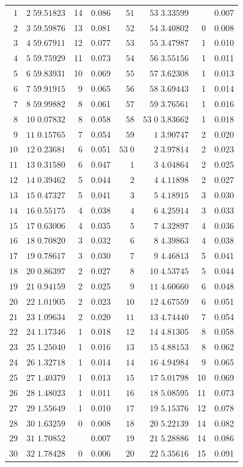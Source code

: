 \begin{center}
\begin{tabular}{|r|r|r|r||r|r|r|r|}
\(1\)&\(2\;59.51823\)&14&0.086&\(51\)&\(53\;3.33599\)&&0.007\\
\(2\)&\(3\;59.59876\)&13&0.081&\(52\)&\(54\;3.40802\)&0&0.008\\
\(3\)&\(4\;59.67911\)&12&0.077&\(53\)&\(55\;3.47987\)&1&0.010\\
\(4\)&\(5\;59.75929\)&11&0.073&\(54\)&\(56\;3.55156\)&1&0.011\\
\(5\)&\(6\;59.83931\)&10&0.069&\(55\)&\(57\;3.62308\)&1&0.013\\
\(6\)&\(7\;59.91915\)&9&0.065&\(56\)&\(58\;3.69443\)&1&0.014\\
\(7\)&\(8\;59.99882\)&8&0.061&\(57\)&\(59\;3.76561\)&1&0.016\\
\(8\)&\(10\;0.07832\)&8&0.058&\(58\)&\(53\;0\;3.83662\)&1&0.018\\
\(9\)&\(11\;0.15765\)&7&0.054&\(59\)&\(1\;3.90747\)&2&0.020\\[3pt]
\(10\)&\(12\;0.23681\)&6&0.051&\(53\;0\)&\(2\;3.97814\)&2&0.023\\
\(11\)&\(13\;0.31580\)&6&0.047&\(1\)&\(3\;4.04864\)&2&0.025\\
\(12\)&\(14\;0.39462\)&5&0.044&\(2\)&\(4\;4.11898\)&2&0.027\\
\(13\)&\(15\;0.47327\)&5&0.041&\(3\)&\(5\;4.18915\)&3&0.030\\
\(14\)&\(16\;0.55175\)&4&0.038&\(4\)&\(6\;4.25914\)&3&0.033\\
\(15\)&\(17\;0.63006\)&4&0.035&\(5\)&\(7\;4.32897\)&4&0.036\\
\(16\)&\(18\;0.70820\)&3&0.032&\(6\)&\(8\;4.39863\)&4&0.038\\
\(17\)&\(19\;0.78617\)&3&0.030&\(7\)&\(9\;4.46813\)&5&0.041\\
\(18\)&\(20\;0.86397\)&2&0.027&\(8\)&\(10\;4.53745\)&5&0.044\\
\(19\)&\(21\;0.94159\)&2&0.025&\(9\)&\(11\;4.60660\)&6&0.048\\[3pt]
\(20\)&\(22\;1.01905\)&2&0.023&\(10\)&\(12\;4.67559\)&6&0.051\\
\(21\)&\(23\;1.09634\)&2&0.020&\(11\)&\(13\;4.74440\)&7&0.054\\
\(22\)&\(24\;1.17346\)&1&0.018&\(12\)&\(14\;4.81305\)&8&0.058\\
\(23\)&\(25\;1.25040\)&1&0.016&\(13\)&\(15\;4.88153\)&8&0.062\\
\(24\)&\(26\;1.32718\)&1&0.014&\(14\)&\(16\;4.94984\)&9&0.065\\
\(25\)&\(27\;1.40379\)&1&0.013&\(15\)&\(17\;5.01798\)&10&0.069\\
\(26\)&\(28\;1.48023\)&1&0.011&\(16\)&\(18\;5.08595\)&11&0.073\\
\(27\)&\(29\;1.55649\)&1&0.010&\(17\)&\(19\;5.15376\)&12&0.078\\
\(28\)&\(30\;1.63259\)&0&0.008&\(18\)&\(20\;5.22139\)&14&0.082\\
\(29\)&\(31\;1.70852\)&&0.007&\(19\)&\(21\;5.28886\)&14&0.086\\
\(30\)&\(32\;1.78428\)&0&0.006&\(20\)&\(22\;5.35616\)&15&0.091\\
\hline
\end{tabular}
\end{center}
\endgroup
